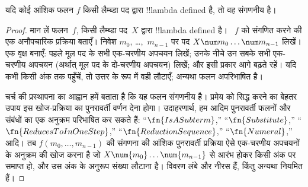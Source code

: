 \documentclass[../../../include/open-logic-section]{subfiles}
\begin{document}

\begin{thm}
यदि कोई आंशिक फलन $f$ किसी लैम्ब्डा पद द्वारा !!{lambda defined} है, तो वह
संगणनीय है।
\end{thm}

\begin{proof}
मान लें फलन~$f$, किसी लैम्ब्डा पद~$X$ द्वारा !!{lambda defined} है।
~$f$ को संगणित करने की एक अनौपचारिक प्रक्रिया बताएँ। निवेश $m_0$,
\dots,~$m_{n-1}$ पर पद $X \num m_0 \ldots \num m_{n-1}$ लिखें। एक वृक्ष
बनाएँ: पहले मूल पद के सभी एक-चरणीय अपचयन लिखें; उनके नीचे उन सबके सभी
एक-चरणीय अपचयन (अर्थात् मूल पद के दो-चरणीय अपचयन) लिखें; और इसी प्रकार आगे
बढ़ते रहें। यदि कभी किसी अंक तक पहुँचें, तो उत्तर के रूप में वही लौटाएँ;
अन्यथा फलन अपरिभाषित है।

चर्च की प्रस्थापना का आह्वान हमें बताता है कि यह फलन संगणनीय है। प्रमेय को
सिद्ध करने का बेहतर उपाय इस खोज-प्रक्रिया का पुनरावर्ती वर्णन देना होगा।
उदाहरणार्थ, हम आदिम पुनरावर्ती फलनों और संबंधों का एक अनुक्रम परिभाषित कर
सकते हैं: ``$\fn{IsASubterm}$,'' ``$\fn{Substitute}$,''
``$\fn{ReducesToInOneStep}$,'' ``$\fn{ReductionSequence}$,''
``$\fn{Numeral}$,'' आदि। तब $f(m_0, \dots, m_{n-1})$ की संगणना की आंशिक
पुनरावर्ती प्रक्रिया ऐसे एक-चरणीय अपचयनों के अनुक्रम की खोज करना है जो $X
\num{m_0} \dots \num{m_{n-1}}$ से आरंभ होकर किसी अंक पर समाप्त हो, और उस
अंक के अनुरूप संख्या लौटाना है। विवरण लंबे और नीरस हैं, किंतु अन्यथा
नियमित हैं।
\end{proof}
\end{document}
